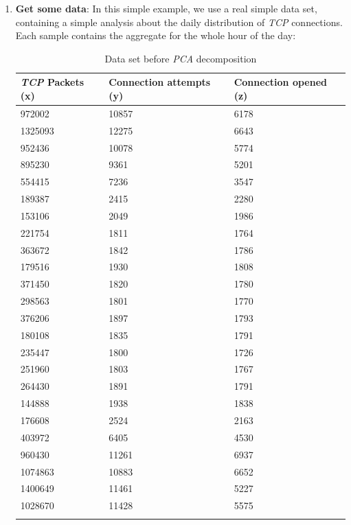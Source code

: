 \documentclass[12pt,a4paper,cucitura]{toptesi}
\begin{document}
\begin{enumerate}
\item \textbf{Get some data}: In this simple example, we use a real simple data set, containing a simple analysis about the daily distribution of \emph{TCP} connections. Each sample contains the aggregate for the whole hour of the day: 

\begin{center}
\begin{longtable}{|p{2cm}|p{3cm}|p{3cm}|}
\hline
\textbf{\emph{TCP} Packets (x)} & \textbf{Connection attempts (y)} & \textbf{Connection opened (z)} \\ 
\hline
\hline
972002 & 10857 & 6178 \\
\hline
1325093 & 12275 & 6643 \\
\hline
952436 & 10078 & 5774 \\
\hline
895230 & 9361 & 5201 \\
\hline
554415 & 7236 & 3547 \\
\hline
189387 & 2415 & 2280 \\
\hline
153106 & 2049 & 1986 \\
\hline
221754 & 1811 & 1764 \\
\hline
363672 & 1842 & 1786 \\
\hline
179516 & 1930 & 1808 \\
\hline
371450 & 1820 & 1780 \\
\hline
298563 & 1801 & 1770 \\
\hline
376206 & 1897 & 1793 \\
\hline
180108 & 1835 & 1791 \\
\hline
235447 & 1800 & 1726 \\
\hline
251960 & 1803 & 1767 \\
\hline
264430 & 1891 & 1791 \\
\hline
144888 & 1938 & 1838 \\
\hline
176608 & 2524 & 2163 \\
\hline
403972 & 6405 & 4530 \\
\hline
960430 & 11261 & 6937 \\
\hline
1074863 & 10883 & 6652 \\
\hline
1400649 & 11461 & 5227 \\
\hline
1028670 & 11428 & 5575 \\
\hline
\caption{Data set before \emph{PCA} decomposition}
\end{longtable}
\end{center}


\end{enumerate}
\end{document}
